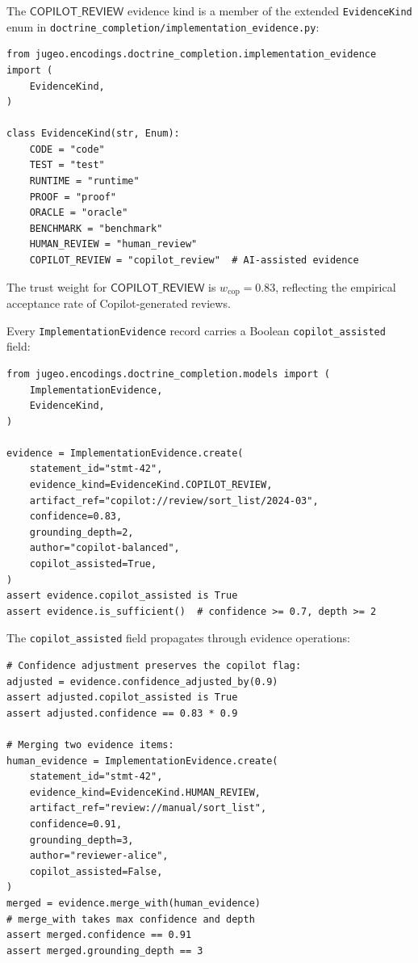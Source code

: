 \documentclass[11pt]{article}
\newcommand{\CopRev}{\mathsf{COPILOT\_REVIEW}}
\newcommand{\copweight}{w_{\mathrm{cop}}}
\begin{document}
\begin{definition}\label{def:copilot-review}
The $\CopRev$ evidence kind is a member of the extended \texttt{EvidenceKind}
enum in \texttt{doctrine\_completion/implementation\_evidence.py}:
\begin{lstlisting}[style=jugeo-python]
from jugeo.encodings.doctrine_completion.implementation_evidence import (
    EvidenceKind,
)

class EvidenceKind(str, Enum):
    CODE = "code"
    TEST = "test"
    RUNTIME = "runtime"
    PROOF = "proof"
    ORACLE = "oracle"
    BENCHMARK = "benchmark"
    HUMAN_REVIEW = "human_review"
    COPILOT_REVIEW = "copilot_review"  # AI-assisted evidence
\end{lstlisting}
The trust weight for $\CopRev$ is $\copweight = 0.83$, reflecting the
empirical acceptance rate of Copilot-generated reviews.
\end{definition}

\begin{definition}\label{def:copilot-flag}
Every \texttt{ImplementationEvidence} record carries a Boolean
\texttt{copilot\_assisted} field:
\begin{lstlisting}[style=jugeo-python]
from jugeo.encodings.doctrine_completion.models import (
    ImplementationEvidence,
    EvidenceKind,
)

evidence = ImplementationEvidence.create(
    statement_id="stmt-42",
    evidence_kind=EvidenceKind.COPILOT_REVIEW,
    artifact_ref="copilot://review/sort_list/2024-03",
    confidence=0.83,
    grounding_depth=2,
    author="copilot-balanced",
    copilot_assisted=True,
)
assert evidence.copilot_assisted is True
assert evidence.is_sufficient()  # confidence >= 0.7, depth >= 2
\end{lstlisting}
\end{definition}

The \texttt{copilot\_assisted} field propagates through evidence operations:

\begin{lstlisting}[style=jugeo-python]
# Confidence adjustment preserves the copilot flag:
adjusted = evidence.confidence_adjusted_by(0.9)
assert adjusted.copilot_assisted is True
assert adjusted.confidence == 0.83 * 0.9

# Merging two evidence items:
human_evidence = ImplementationEvidence.create(
    statement_id="stmt-42",
    evidence_kind=EvidenceKind.HUMAN_REVIEW,
    artifact_ref="review://manual/sort_list",
    confidence=0.91,
    grounding_depth=3,
    author="reviewer-alice",
    copilot_assisted=False,
)
merged = evidence.merge_with(human_evidence)
# merge_with takes max confidence and depth
assert merged.confidence == 0.91
assert merged.grounding_depth == 3
\end{lstlisting}
\end{document}
